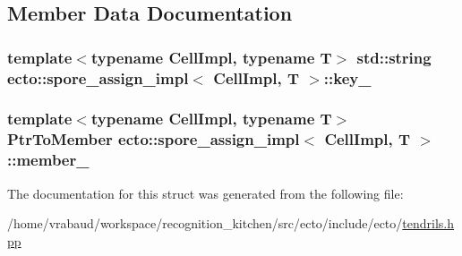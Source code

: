 \subsection{Member Data Documentation}
\subsubsection[{\texorpdfstring{key\+\_\+}{key_}}]{\setlength{\rightskip}{0pt plus 5cm}template$<$typename Cell\+Impl, typename T$>$ std\+::string {\bf ecto\+::spore\+\_\+assign\+\_\+impl}$<$ Cell\+Impl, T $>$\+::key\+\_\+}\hypertarget{structecto_1_1spore__assign__impl_a961946cb7f186c6a836467363b747915}{}\label{structecto_1_1spore__assign__impl_a961946cb7f186c6a836467363b747915}
\subsubsection[{\texorpdfstring{member\+\_\+}{member_}}]{\setlength{\rightskip}{0pt plus 5cm}template$<$typename Cell\+Impl, typename T$>$ {\bf Ptr\+To\+Member} {\bf ecto\+::spore\+\_\+assign\+\_\+impl}$<$ Cell\+Impl, T $>$\+::member\+\_\+}\hypertarget{structecto_1_1spore__assign__impl_a8d8ead313308f3ecfb7d5f2ed4fbe975}{}\label{structecto_1_1spore__assign__impl_a8d8ead313308f3ecfb7d5f2ed4fbe975}


The documentation for this struct was generated from the following file\+:\begin{DoxyCompactItemize}
\item 
/home/vrabaud/workspace/recognition\+\_\+kitchen/src/ecto/include/ecto/\hyperlink{tendrils_8hpp}{tendrils.\+hpp}\end{DoxyCompactItemize}
